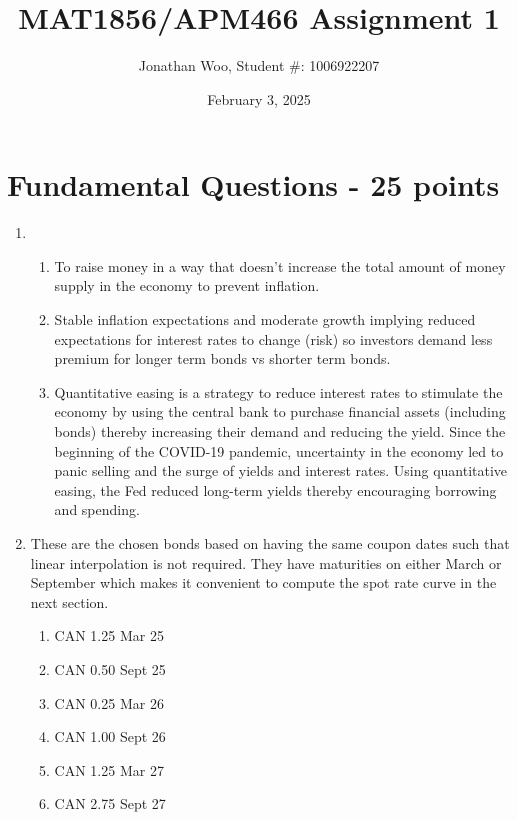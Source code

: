 \documentclass{article}
\title{MAT1856/APM466 Assignment 1}
\author{Jonathan Woo, Student \#: 1006922207}
\date{February 3, 2025}
\begin{document}
\setlength{\droptitle}{-2cm}
\maketitle
\vspace{-3em}

\section*{Fundamental Questions - 25 points}

\begin{enumerate}
    \item \hfill
          \begin{enumerate}
              \item To raise money in a way that doesn't increase the total amount of money supply in the economy to prevent inflation.
              \item Stable inflation expectations and moderate growth implying reduced expectations for interest rates to change (risk) so investors demand less premium for longer term bonds vs shorter term bonds.
              \item Quantitative easing is a strategy to reduce interest rates to stimulate the economy by using the central bank to purchase financial assets (including bonds) thereby increasing their demand and reducing the yield. Since the beginning of the COVID-19 pandemic, uncertainty in the economy led to panic selling and the surge of yields and interest rates. Using quantitative easing, the Fed reduced long-term yields thereby encouraging borrowing and spending.
          \end{enumerate}
    \item These are the chosen bonds based on having the same coupon dates such that linear interpolation is not required. They have maturities on either March or September which makes it convenient to compute the spot rate curve in the next section.
          \begin{multicols}{4}
              \begin{enumerate}[label=\roman*.]
                  \item CAN 1.25 Mar 25
                  \item CAN 0.50 Sept 25
                  \item CAN 0.25 Mar 26
                  \item CAN 1.00 Sept 26
                  \item CAN 1.25 Mar 27
                  \item CAN 2.75 Sept 27

\end{enumerate}
\end{multicols}
\end{enumerate}
\end{document}
